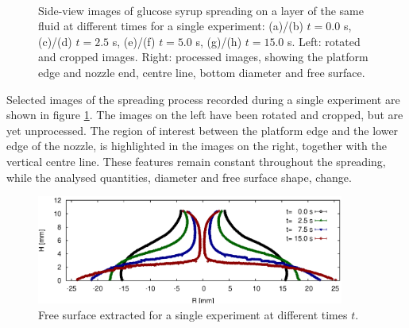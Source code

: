 \documentclass[aip,graphicx]{revtex4-1}
\begin{document}
\begin{figure}[!ht]
  \\
  \hspace{0.5cm}
  \caption{Side-view images of glucose syrup spreading on a layer of the same fluid at different times for a single experiment: (a)/(b) $t=0.0$ s, (c)/(d) $t=2.5$ s, (e)/(f) $t=5.0$ s, (g)/(h) $t=15.0$ s. Left: rotated and cropped images. Right: processed images, showing the platform edge and nozzle end, centre line, bottom diameter and free surface.\label{fig:glucose_spreading}}
\end{figure}

Selected images of the spreading process recorded during a single experiment are shown in figure \ref{fig:glucose_spreading}. 
The images on the left have been rotated and cropped, but are yet unprocessed. 
The region of interest between the platform edge and the lower edge of the nozzle, is highlighted in the images on the right, together with the vertical centre line. 
These features remain constant throughout the spreading, while the analysed quantities, diameter and free surface shape, change.

\begin{figure}[!ht]
\centering
\includegraphics[width=0.9\textwidth]{figures/glucose_thick_layer_8_fs_dim.eps}
\caption{Free surface extracted for a single experiment at different times $t$.}
\label{fig:glucose_thick_layer_8_fs_dim}
\end{figure}
\end{document}
